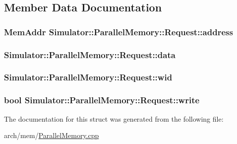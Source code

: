 \subsection{Member Data Documentation}
\hypertarget{struct_simulator_1_1_parallel_memory_1_1_request_a3c3900e2d259e06d035c6423cd97274a}{
\subsubsection[{address}]{\setlength{\rightskip}{0pt plus 5cm}Mem\+Addr Simulator\+::\+Parallel\+Memory\+::\+Request\+::address}}\label{struct_simulator_1_1_parallel_memory_1_1_request_a3c3900e2d259e06d035c6423cd97274a}
\hypertarget{struct_simulator_1_1_parallel_memory_1_1_request_a65da7464a8bb003ac5e6a2a4cd2ed356}{
\subsubsection[{data}]{ Simulator\+::\+Parallel\+Memory\+::\+Request\+::data}}\label{struct_simulator_1_1_parallel_memory_1_1_request_a65da7464a8bb003ac5e6a2a4cd2ed356}
\hypertarget{struct_simulator_1_1_parallel_memory_1_1_request_a7f0a25f1a0dd3fbc64bfa8e77eb8bdac}{
\subsubsection[{wid}]{ Simulator\+::\+Parallel\+Memory\+::\+Request\+::wid}}\label{struct_simulator_1_1_parallel_memory_1_1_request_a7f0a25f1a0dd3fbc64bfa8e77eb8bdac}
\hypertarget{struct_simulator_1_1_parallel_memory_1_1_request_a00911f5856e9605735dd9cbc31eb7344}{
\subsubsection[{write}]{\setlength{\rightskip}{0pt plus 5cm}bool Simulator\+::\+Parallel\+Memory\+::\+Request\+::write}}\label{struct_simulator_1_1_parallel_memory_1_1_request_a00911f5856e9605735dd9cbc31eb7344}


The documentation for this struct was generated from the following file\+:\begin{DoxyCompactItemize}
\item 
arch/mem/\hyperlink{_parallel_memory_8cpp}{Parallel\+Memory.\+cpp}\end{DoxyCompactItemize}
